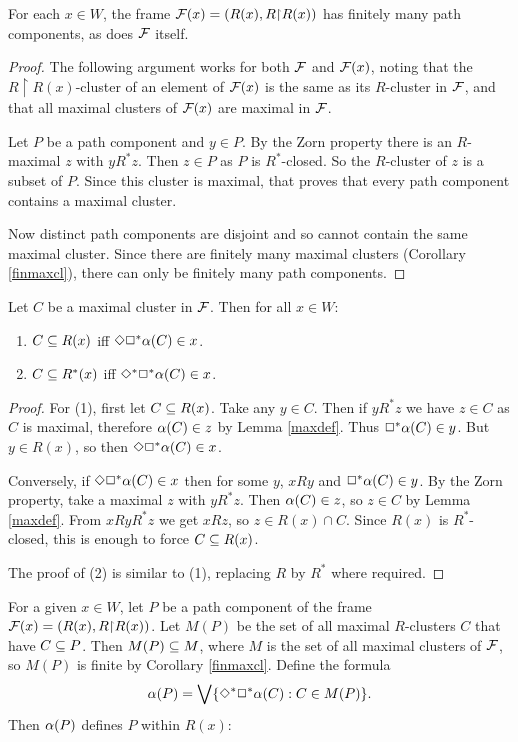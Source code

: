 \begin{lemma} \label{finpthcmp}
For each $x\in W$, the frame $\mathcal{F}(x)=(R(x),R{\restriction} R(x))$ has  finitely many path components,
as does $\mathcal{F}$ itself.
\end{lemma}
\begin{proof}
 The following argument works for both $\mathcal{F}$ and $\mathcal{F}(x)$, noting that the $R{\restriction} R(x)$-cluster of an element of $\mathcal{F}(x)$ is the same as its $R$-cluster in $\mathcal{F}$, and that all maximal clusters of $\mathcal{F}(x)$ are maximal in $\mathcal{F}$.

Let $P$ be a path component and $y\in P$. By the Zorn property there is an $R$-maximal $z$ with $yR^* z$. Then  $z\in P$ as $P$ is $R^*$-closed. So  the $R$-cluster of $z$ is a subset of $P$. Since this cluster is maximal, that proves that every path component contains a maximal cluster.

Now distinct path components are disjoint and so cannot contain the same maximal cluster. Since there are finitely many maximal clusters (Corollary \ref{finmaxcl}), there can only be finitely many path components.
\end{proof}

\begin{lemma}  \label{defCRx}
Let $C$ be a maximal cluster in $\mathcal{F}$. Then for all $x\in W$:
\begin{enumerate}[\rm(1)]
\item 
$C\subseteq R(x)$ iff\/ $\Diamond\Box^*\alpha(C)\in x$.
\item
$C\subseteq R^*(x)$ iff\/ $\Diamond^*\Box^*\alpha(C)\in x$.
\end{enumerate}
\end{lemma}

\begin{proof}
For (1), first let $C\subseteq R(x)$. Take any $y\in C$. Then if $yR^*z$ we have $z\in C$ as $C$ is maximal, therefore $\alpha(C)\in z$ by Lemma \ref{maxdef}. Thus $\Box^*\alpha(C)\in y$. But $y\in R(x)$, so then $\Diamond\Box^*\alpha(C)\in x$.

Conversely, if $\Diamond\Box^*\alpha(C)\in x$ then for some $y$, $xRy$ and $\Box^*\alpha(C)\in y$. By the Zorn property, take a maximal $z$ with $yR^*z$. Then $\alpha(C)\in z$, so $z\in C$ by Lemma \ref{maxdef}. From $xRyR^*z$ we get $xRz$, so $z\in R(x)\cap C$.
Since $R(x)$ is $R^*$-closed, this is enough to force $C\subseteq R(x)$.

The proof of (2) is similar to (1), replacing $R$ by $R^*$ where required.
\end{proof}

For a given $x\in W$, let $P$ be a path component of the frame ${\cal F}(x)=(R(x),R{\restriction} R(x))$. Let $M(P)$ be the set of all  maximal $R$-clusters $C$ that have  $C\subseteq P$. Then $M(P)\subseteq M$, where $M$ is the set of all maximal clusters of $\mathcal{F}$, so $M(P)$ is finite by Corollary \ref{finmaxcl}. Define the formula
$$
\alpha(P)=\bigvee\{\Diamond^*\Box^*\alpha(C):C\in M(P)\}.
$$
Then $\alpha(P)$ defines $P$ within $R(x)$:

